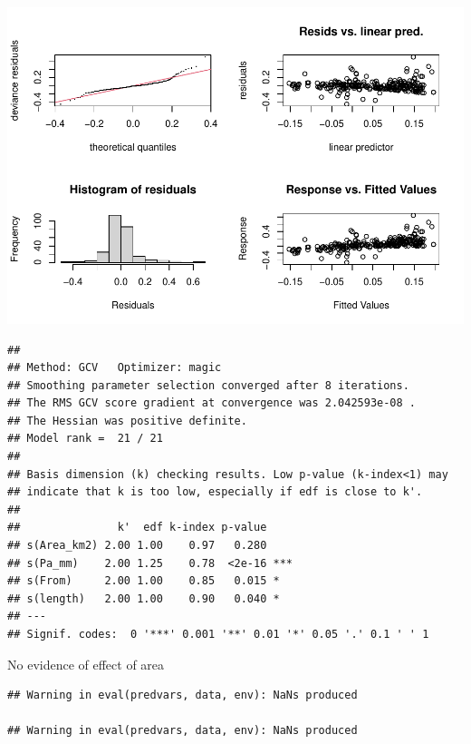 \documentclass[]{elsarticle} %
\begin{document}
\includegraphics{Forest_and_Water_files/figure-latex/model2c-1.pdf}

\begin{verbatim}
## 
## Method: GCV   Optimizer: magic
## Smoothing parameter selection converged after 8 iterations.
## The RMS GCV score gradient at convergence was 2.042593e-08 .
## The Hessian was positive definite.
## Model rank =  21 / 21 
## 
## Basis dimension (k) checking results. Low p-value (k-index<1) may
## indicate that k is too low, especially if edf is close to k'.
## 
##               k'  edf k-index p-value    
## s(Area_km2) 2.00 1.00    0.97   0.280    
## s(Pa_mm)    2.00 1.25    0.78  <2e-16 ***
## s(From)     2.00 1.00    0.85   0.015 *  
## s(length)   2.00 1.00    0.90   0.040 *  
## ---
## Signif. codes:  0 '***' 0.001 '**' 0.01 '*' 0.05 '.' 0.1 ' ' 1
\end{verbatim}

No evidence of effect of area

\begin{verbatim}
## Warning in eval(predvars, data, env): NaNs produced

## Warning in eval(predvars, data, env): NaNs produced
\end{verbatim}
\end{document}
